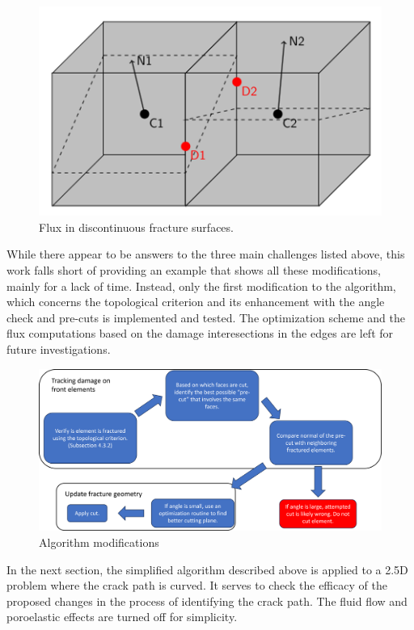 \begin{figure}[h]
    \centering
    \includegraphics[width=0.6\linewidth]{Chapter4/figures/nonplanar/nonplanar_flux.png}
    \caption{Flux in discontinuous fracture surfaces.}
    \label{fig:flux_calculations}
\end{figure}


While there appear to be answers to the three main challenges listed above, this work falls short of providing an example that shows all these modifications, mainly for a lack of time. Instead, only the first modification to the algorithm, which concerns the topological criterion and its enhancement with the angle check and pre-cuts is implemented and tested. The optimization scheme and the flux computations based on the damage interesections in the edges are left for future investigations. 

\begin{figure}[h]
    \centering
    \includegraphics[width=0.95\linewidth]{Chapter4/figures/nonplanar/nonplanar_algo.png}
    \caption{Algorithm modifications}
    \label{fig:nonplanar_algo}
\end{figure}


In the next section, the simplified algorithm described above is applied to a 2.5D problem where the crack path is curved. It serves to check the efficacy of the proposed changes in the process of identifying the crack path. The fluid flow and poroelastic effects are turned off for simplicity.

